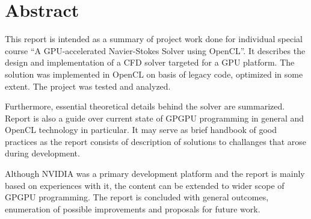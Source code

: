 \chapter{Abstract}
This report is intended as a summary of project work done for individual special course \enquote{A GPU-accelerated Navier-Stokes Solver using OpenCL}. It describes the design and implementation of a CFD solver targeted for a GPU platform. The solution was implemented in OpenCL on basis of legacy code, optimized in some extent. The project was tested and analyzed.

Furthermore, essential theoretical details behind the solver are summarized. Report is also a guide over current state of GPGPU programming in general and OpenCL technology in particular. It may serve as brief handbook of good practices as the report consists of description of solutions to challanges that arose during development.

Although NVIDIA was a primary development platform and the report is mainly based on experiences with it, the content can be extended to wider scope of GPGPU programming. The report is concluded with general outcomes, enumeration of possible improvements and proposals for future work.